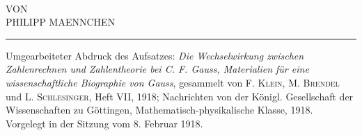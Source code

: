 \clearpage\begingroup\NoSourceHead{}
\begin{center}
\setlength{\fboxsep}{1em}
\end{center}
\clearpage\NoSourceHead{}
\begin{center}
\vspace*{.7in}{\Large GAUSS ALS ZAHLENRECHNER}\\[.8in]
VON\\[.8in]
{\large PHILIPP MAENNCHEN}
\end{center}
\vfill
\noindent\rule{\textwidth}{.3pt}\par
\begin{center}\small
Umgearbeiteter Abdruck des Aufsatzes: \textit{Die Wechselwirkung zwischen Zahlenrechnen und Zahlentheorie bei C. F. Gauss, Materialien für eine wissenschaftliche Biographie von Gauss}, gesammelt von \textsc{F. Klein, M. Brendel} und \textsc{L. Schlesinger}, Heft VII, 1918; Nachrichten von der Königl. Gesellschaft der Wissenschaften zu Göttingen, Mathematisch-physikalische Klasse, 1918.\\
Vorgelegt in der Sitzung vom 8. Februar 1918.
\end{center}
